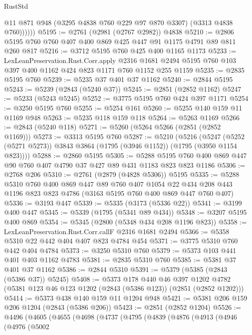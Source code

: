 \begin{lexlean}{RustStd}
\begin{coremodule}
              @11
              @871
              @948
              (@3295 @4838 @760 @229 @97 @870 @3307)
              (@3313 @4838 @760))))))
@5195 := @2761 (@2981 (@2767 @2982)) @4838
@5210 := @2806 @5195 @760 @760 @407 @400 @869 @425 @447 @91 @1175 @4791 @89 @811 @260 @817
@5216 := @3712 @5195 @760 @425 @400 @1165 @1173
@5233 := LexLeanPreservation.Rust.Corr.apply
    @2316
    @1681
    @2494
    @5195
    @760
    @103
    @397
    @400
    @1162
    @424
    @823
    @1171
    @760
    @1152
    @255
    @1159
@5235 := @2835 @5195 @760
@5239 := @5235 @37 @401 @37 @1162
@5240 := @2844 @5195
@5243 := @5239 (@2843 (@5240 @37))
@5245 := @2851 (@2852 @1162)
@5247 := @5233 (@5243 @5245)
@5252 := @3775 @5195 @760 @424 @397 @1171
@5254 := @3250 @5195 @760
@5255 := @5254 @161
@5260 := @5255 @140 @159 @11 @1169 @948
@5263 := @5235 @118 @159 @118
@5264 := @5263 @1169
@5266 := @2843 (@5240 @118)
@5271 := @5260 (@5264 @5266 (@2851 (@2852 @1169)))
@5273 := @3313 @5195 @760
@5287 := @5210
    (@5216
      (@5247 (@5252 (@5271 @5273)) @3843 @3864 (@1795 (@3946 @1152)) (@1795 (@3950 @1154 @823))))
@5288 := @2860 @5195
@5305 := @5288 @5195 @760 @400 @869 @447 @90 @760 @407 @4790 @37 @427 @89 @431 @1183 @823 @823 @1186
@5306 := @2768 @206
@5310 := @2761 (@2879 (@4828 @5306)) @5195
@5335 := @5288
    @5310
    @760
    @400
    @869
    @447
    @89
    @760
    @407
    @1054
    @22
    @434
    @208
    @443
    @1196
    @823
    @823
    @4786
    (@3163 @5195 @760 @400 @869 @447 @760 @407)
@5336 := @3193 @447
@5339 := @5335 (@3173 (@5336 @22))
@5341 := @3199 @400 @447
@5345 := @5339 (@1795 (@5341 @89 @434))
@5348 := @3207 @5195 @400 @869
@5354 := @5345 (@2800 (@5348 @434 @208 @1196 @823))
@5358 := LexLeanPreservation.Rust.Corr.callF @2316 @1681 @2494
@5366 := @5358 @5310 @22 @442 @404 @407 @823 @4784 @454
@5371 := @3775 @5310 @760 @442 @404 @4784
@5373 := @3250 @5310 @760
@5379 := @5373 @103 @441 @401 @403 @1162 @4783
@5381 := @2835 @5310 @760
@5385 := @5381 @37 @401 @37 @1162
@5386 := @2844 @5310
@5391 := @5379 (@5385 (@2843 (@5386 @37)) @5245)
@5408 := @5373
    @178
    @440
    @46
    @397
    @1202
    @4782
    (@5381 @123 @46 @123 @1202 (@2843 (@5386 @123)) (@2851 (@2852 @1202)))
@5414 := @5373 @438 @140 @159 @11 @1204 @948
@5421 := @5381 @206 @159 @206 @1204 (@2843 (@5386 @206))
@5423 := @2851 (@2852 @1204)
@5526 := @4496
    (@4605
      (@4655
        (@4698
          (@4737
            (@4795
              (@4839
                (@4876
                  (@4913
                    (@4946
                      (@4976
                        (@5002

\end{coremodule}
\end{lexlean}
